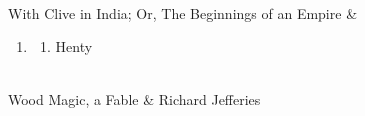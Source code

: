 \documentclass[letterpaper,10pt,english]{sphinxmanual}
\begin{document}
\begin{savenotes}
\begin{longtable}{}
\begin{enumerate}
\begin{enumerate}
\end{enumerate}

\end{enumerate}
\\
\sphinxhline
\sphinxAtStartPar
With Clive in India; Or, The Beginnings of an Empire
&\begin{enumerate}
%
\setcounter{enumi}{6}
\item {} \begin{enumerate}
%
\item {} 
\sphinxAtStartPar
Henty

\end{enumerate}

\end{enumerate}
\\
\sphinxhline
\sphinxAtStartPar
Wood Magic, a Fable
&
\sphinxAtStartPar
Richard Jefferies
\\
\sphinxbottomrule
\end{longtable}
\sphinxtableafterendhook
\sphinxatlongtableend
\end{savenotes}
\end{document}
